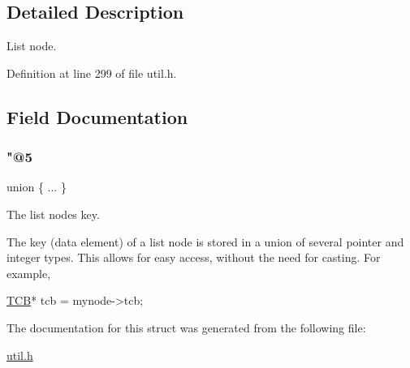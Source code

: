 \subsection{Detailed Description}
List node. 

Definition at line 299 of file util.\+h.



\subsection{Field Documentation}
\mbox{\label{structresource__list__node_aba8874eccf1ac3e7657c726a4f86536c}} 
\subsubsection{\texorpdfstring{"@5}{@5}}
{\footnotesize\ttfamily union \{ ... \} }



The list node\textquotesingle{}s key. 

The key (data element) of a list node is stored in a union of several pointer and integer types. This allows for easy access, without the need for casting. For example, 
\begin{DoxyCode}
\hyperlink{structthread__control__block}{TCB}* tcb = mynode->tcb;
\end{DoxyCode}
 

The documentation for this struct was generated from the following file\+:\begin{DoxyCompactItemize}
\item 
\hyperlink{util_8h}{util.\+h}\end{DoxyCompactItemize}
